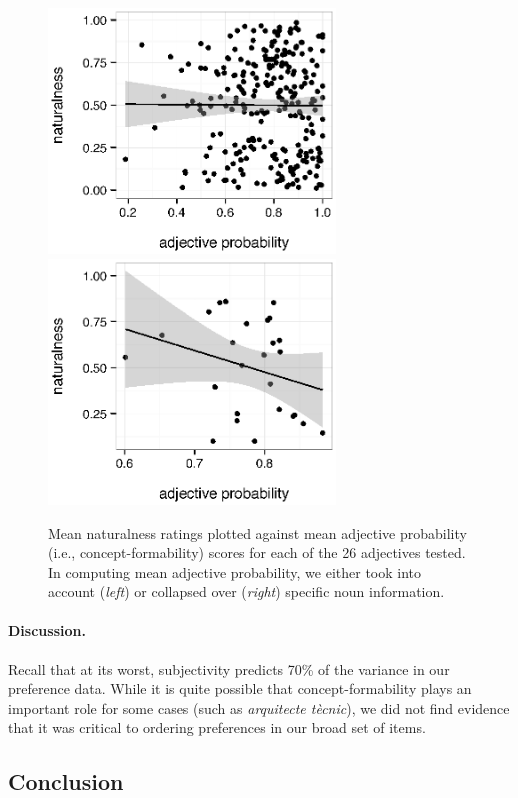 \documentclass[12pt]{article}
\begin{document}
\renewcommand\thefigure{A.\arabic{figure}}
\begin{figure}
	\centering\includegraphics[width=3in]{plots/naturalness-concept-noun-pred.eps}\includegraphics[width=3in]{plots/naturalness-concept-adjective.eps}
	\caption{Mean naturalness ratings plotted against mean adjective probability (i.e., concept-formability) scores for each of the 26 adjectives tested. In computing mean adjective probability, we either took into account (\emph{left}) or collapsed over (\emph{right}) specific noun information.}\label{fig:concept}
\end{figure}

\paragraph{Discussion.} Recall that at its worst, subjectivity predicts 70\% of the variance in our preference data. 
While it is quite possible that concept-formability plays an important role for some cases (such as \emph{arquitecte t\`{e}cnic}), we did not find evidence that it was critical to ordering preferences in our broad set of items. 

\subsection{Conclusion}
\end{document}
